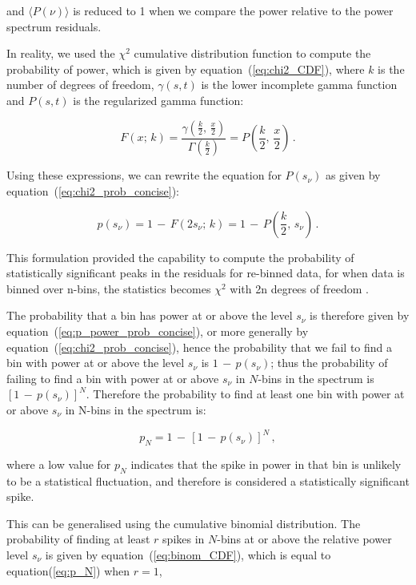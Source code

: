 and $\langle P(\nu) \rangle$ is reduced to 1 when we compare the power relative to the power spectrum residuals.

In reality, we used the $\chi^2$ cumulative distribution function to compute the probability of power, which is given by equation~(\ref{eq:chi2_CDF}), where $k$ is the number of degrees of freedom, $\gamma(s,t)$ is the lower incomplete gamma function and $P(s,t)$ is the regularized gamma function: 

\begin{equation}
F(x; \, k) = \frac{\gamma (\frac{k}{2}, \, \frac{x}{2})}{\Gamma(\frac{k}{2})} = P\left(\frac{k}{2}, \, \frac{x}{2}\right) \, .
\label{eq:chi2_CDF}
\end{equation}


Using these expressions, we can rewrite the equation for $P(s_{\nu})$ as given by equation~(\ref{eq:chi2_prob_concise}): 

\begin{equation}
p(s_{\nu}) = 1 \, - \, F(2s_{\nu}; \, k) =1 \, - \, P\left(\frac{k}{2}, \, s_{\nu}\right) \, .
\label{eq:chi2_prob_concise}
\end{equation}

This formulation provided the capability to compute the probability of statistically significant peaks in the residuals for re-binned data, for when data is binned over n-bins, the statistics becomes $\chi^{2}$ with 2n degrees of freedom \citep{appourchaux_detecting_2004}.

The probability that a bin has power at or above the level $s_{\nu}$ is therefore given by equation~(\ref{eq:p_power_prob_concise}), or more generally by equation~(\ref{eq:chi2_prob_concise}), hence the probability that we fail to find a bin with power at or above the level $s_{\nu}$ is $1 \, - \, p(s_{\nu})$; thus the probability of failing to find a bin with power at or above $s_{\nu}$ in $N$-bins in the spectrum is $[1 \, - \, p(s_{\nu})]^N$. Therefore the probability to find at least one bin with power at or above $s_{\nu}$ in N-bins in the spectrum is:

\begin{equation}
p_N = 1\, - \, [1 \, - \, p(s_{\nu})]^N \, ,
\label{eq:p_N}
\end{equation}

where a low value for $p_N$ indicates that the spike in power in that bin is unlikely to be a statistical fluctuation, and therefore is considered a statistically significant spike.

This can be generalised using the cumulative binomial distribution. The probability of finding at least $r$ spikes in $N$-bins at or above the relative power level $s_{\nu}$ is given by equation~(\ref{eq:binom_CDF}), which is equal to equation(\ref{eq:p_N}) when $r=1$,

